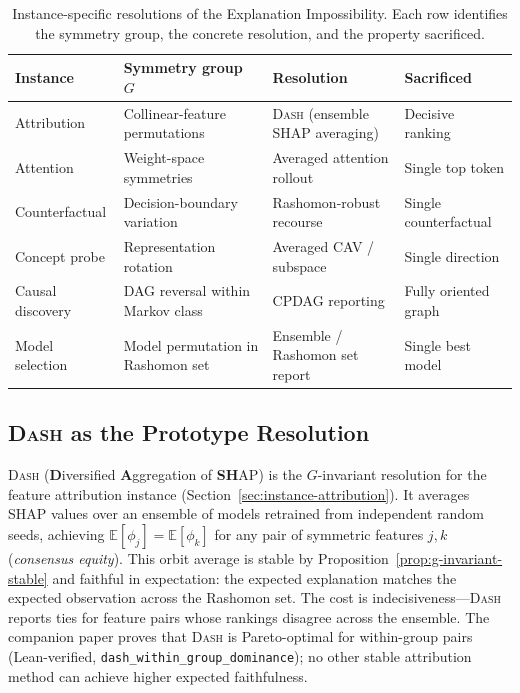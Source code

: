 \documentclass[twoside]{jmlr}
\newcommand{\E}{\mathbb{E}}
\newcommand{\DASH}{\textsc{Dash}}
\begin{document}
\begin{table}[t]
\centering
\caption{Instance-specific resolutions of the Explanation
  Impossibility.  Each row identifies the symmetry group, the concrete
  resolution, and the property sacrificed.}
\label{tab:resolutions}
\small
\begin{tabular}{@{}llll@{}}
\toprule
Instance & Symmetry group $G$ & Resolution & Sacrificed \\
\midrule
Attribution &
  Collinear-feature permutations &
  \DASH{} (ensemble SHAP averaging) &
  Decisive ranking \\
Attention &
  Weight-space symmetries &
  Averaged attention rollout &
  Single top token \\
Counterfactual &
  Decision-boundary variation &
  Rashomon-robust recourse &
  Single counterfactual \\
Concept probe &
  Representation rotation &
  Averaged CAV / subspace &
  Single direction \\
Causal discovery &
  DAG reversal within Markov class &
  CPDAG reporting &
  Fully oriented graph \\
Model selection &
  Model permutation in Rashomon set &
  Ensemble / Rashomon set report &
  Single best model \\
\bottomrule
\end{tabular}
\end{table}

\subsection{\DASH{} as the Prototype Resolution}
\label{sec:dash-prototype}

\DASH{} (\textbf{D}iversified \textbf{A}ggregation of \textbf{SH}AP)
is the $G$-invariant resolution for the feature attribution instance
(Section~\ref{sec:instance-attribution}).  It averages SHAP values over an
ensemble of models retrained from independent random seeds, achieving
$\E[\phi_j] = \E[\phi_k]$ for any pair of symmetric features $j, k$
(\emph{consensus equity}).  This orbit average is stable by
Proposition~\ref{prop:g-invariant-stable} and faithful in expectation: the
expected explanation matches the expected observation across the Rashomon set.
The cost is indecisiveness---\DASH{} reports ties for feature pairs whose
rankings disagree across the ensemble.  The companion paper proves that
\DASH{} is Pareto-optimal for within-group pairs (Lean-verified, \texttt{dash\_within\_group\_dominance}); no other stable attribution method can achieve
higher expected faithfulness.
\end{document}
